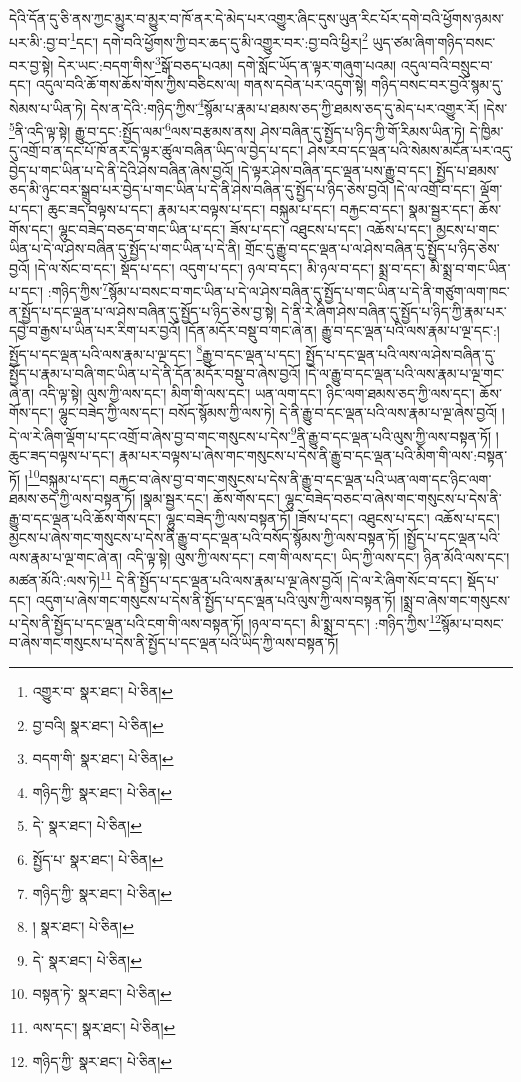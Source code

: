 དེའི་དོན་དུ་ཅི་ནས་ཀྱང་མྱུར་བ་མྱུར་བ་ཁོ་ནར་དེ་མེད་པར་འགྱུར་ཞིང་དུས་ཡུན་རིང་པོར་དགེ་བའི་ཕྱོགས་ཉམས་པར་མི་:བྱ་བ་\footnote{འགྱུར་བ་  སྣར་ཐང་།  པེ་ཅིན། }དང་། དགེ་བའི་ཕྱོགས་ཀྱི་བར་ཆད་དུ་མི་འགྱུར་བར་:བྱ་བའི་ཕྱིར།\footnote{བྱ་བའི།  སྣར་ཐང་།  པེ་ཅིན། } ཡུད་ཙམ་ཞིག་གཉིད་བསང་བར་བྱ་སྟེ། དེར་ཡང་:བདག་གིས་\footnote{བདག་གི་  སྣར་ཐང་།  པེ་ཅིན། }སྒོ་བཅད་པའམ། དགེ་སློང་ཡོད་ན་ལྟར་གཞུག་པའམ། འདུལ་བའི་བསྲུང་བ་དང་། འདུལ་བའི་ཆོ་གས་ཆོས་གོས་ཀྱིས་བཅིངས་ལ། གནས་དབེན་པར་འདུག་སྟེ། གཉིད་བསང་བར་བྱའོ་སྙམ་དུ་སེམས་པ་ཡིན་ཏེ། དེས་ན་དེའི་:གཉིད་ཀྱིས་\footnote{གཉིད་ཀྱི་  སྣར་ཐང་།  པེ་ཅིན། }སྙོམ་པ་རྣམ་པ་ཐམས་ཅད་ཀྱི་ཐམས་ཅད་དུ་མེད་པར་འགྱུར་རོ། །དེས་\footnote{དེ་  སྣར་ཐང་།  པེ་ཅིན། }ནི་འདི་ལྟ་སྟེ། རྒྱུ་བ་དང་:སྤྱོད་ལམ་\footnote{སྤྱོད་པ་  སྣར་ཐང་།  པེ་ཅིན། }ལས་བརྩམས་ནས། ཤེས་བཞིན་དུ་སྤྱོད་པ་ཉིད་ཀྱི་གོ་རིམས་ཡིན་ཏེ། དེ་ཁྱིམ་དུ་འགྲོ་བ་ན་དང་པོ་ཁོ་ནར་དེ་ལྟར་ཚུལ་བཞིན་ཡིད་ལ་བྱེད་པ་དང་། ཤེས་རབ་དང་ལྡན་པའི་སེམས་མངོན་པར་འདུ་བྱེད་པ་གང་ཡིན་པ་དེ་ནི་དེའི་ཤེས་བཞིན་ཞེས་བྱའོ། །དེ་ལྟར་ཤེས་བཞིན་དང་ལྡན་པས་རྒྱུ་བ་དང་། སྤྱོད་པ་ཐམས་ཅད་མི་ཉུང་བར་སྒྲུབ་པར་བྱེད་པ་གང་ཡིན་པ་དེ་ནི་ཤེས་བཞིན་དུ་སྤྱོད་པ་ཉིད་ཅེས་བྱའོ། །དེ་ལ་འགྲོ་བ་དང་། ལྡོག་པ་དང་། ཆུང་ཟད་བལྟས་པ་དང་། རྣམ་པར་བལྟས་པ་དང་། བསྐུམ་པ་དང་། བརྐྱང་བ་དང་། སྣམ་སྦྱར་དང་། ཆོས་གོས་དང་། ལྷུང་བཟེད་བཅད་བ་གང་ཡིན་པ་དང་། ཟོས་པ་དང་། འཐུངས་པ་དང་། འཆོས་པ་དང་། མྱངས་པ་གང་ཡིན་པ་དེ་ལ་ཤེས་བཞིན་དུ་སྤྱོད་པ་གང་ཡིན་པ་དེ་ནི། གྲོང་དུ་རྒྱུ་བ་དང་ལྡན་པ་ལ་ཤེས་བཞིན་དུ་སྤྱོད་པ་ཉིད་ཅེས་བྱའོ། །དེ་ལ་སོང་བ་དང་། སྡོད་པ་དང་། འདུག་པ་དང་། ཉལ་བ་དང་། མི་ཉལ་བ་དང་། སྨྲ་བ་དང་། མི་སྨྲ་བ་གང་ཡིན་པ་དང་། :གཉིད་ཀྱིས་\footnote{གཉིད་ཀྱི་  སྣར་ཐང་།  པེ་ཅིན། }སྙོམ་པ་བསང་བ་གང་ཡིན་པ་དེ་ལ་ཤེས་བཞིན་དུ་སྤྱོད་པ་གང་ཡིན་པ་དེ་ནི་གཙུག་ལག་ཁང་ན་སྤྱོད་པ་དང་ལྡན་པ་ལ་ཤེས་བཞིན་དུ་སྤྱོད་པ་ཉིད་ཅེས་བྱ་སྟེ། དེ་ནི་རེ་ཞིག་ཤེས་བཞིན་དུ་སྤྱོད་པ་ཉིད་ཀྱི་རྣམ་པར་དབྱེ་བ་རྒྱས་པ་ཡིན་པར་རིག་པར་བྱའོ། །དོན་མདོར་བསྡུ་བ་གང་ཞེ་ན། རྒྱུ་བ་དང་ལྡན་པའི་ལས་རྣམ་པ་ལྔ་དང་:།སྤྱོད་པ་དང་ལྡན་པའི་ལས་རྣམ་པ་ལྔ་དང་། \footnote{།   སྣར་ཐང་།  པེ་ཅིན། }རྒྱུ་བ་དང་ལྡན་པ་དང་། སྤྱོད་པ་དང་ལྡན་པའི་ལས་ལ་ཤེས་བཞིན་དུ་སྤྱོད་པ་རྣམ་པ་བཞི་གང་ཡིན་པ་དེ་ནི་དོན་མདོར་བསྡུ་བ་ཞེས་བྱའོ། །དེ་ལ་རྒྱུ་བ་དང་ལྡན་པའི་ལས་རྣམ་པ་ལྔ་གང་ཞེ་ན། འདི་ལྟ་སྟེ། ལུས་ཀྱི་ལས་དང་། མིག་གི་ལས་དང་། ཡན་ལག་དང་། ཉིང་ལག་ཐམས་ཅད་ཀྱི་ལས་དང་། ཆོས་གོས་དང་། ལྷུང་བཟེད་ཀྱི་ལས་དང་། བསོད་སྙོམས་ཀྱི་ལས་ཏེ། དེ་ནི་རྒྱུ་བ་དང་ལྡན་པའི་ལས་རྣམ་པ་ལྔ་ཞེས་བྱའོ། །དེ་ལ་རེ་ཞིག་ལྡོག་པ་དང་འགྲོ་བ་ཞེས་བྱ་བ་གང་གསུངས་པ་དེས་\footnote{དེ་  སྣར་ཐང་།  པེ་ཅིན། }ནི་རྒྱུ་བ་དང་ལྡན་པའི་ལུས་ཀྱི་ལས་བསྟན་ཏོ། །ཆུང་ཟད་བལྟས་པ་དང་། རྣམ་པར་བལྟས་པ་ཞེས་གང་གསུངས་པ་དེས་ནི་རྒྱུ་བ་དང་ལྡན་པའི་མིག་གི་ལས་:བསྟན་ཏོ། །\footnote{བསྟན་ཏེ་  སྣར་ཐང་།  པེ་ཅིན། }བསྐུམ་པ་དང་། བརྐྱང་བ་ཞེས་བྱ་བ་གང་གསུངས་པ་དེས་ནི་རྒྱུ་བ་དང་ལྡན་པའི་ཡན་ལག་དང་ཉིང་ལག་ཐམས་ཅད་ཀྱི་ལས་བསྟན་ཏོ། །སྣམ་སྦྱར་དང་། ཆོས་གོས་དང་། ལྷུང་བཟེད་བཅང་བ་ཞེས་གང་གསུངས་པ་དེས་ནི་རྒྱུ་བ་དང་ལྡན་པའི་ཆོས་གོས་དང་། ལྷུང་བཟེད་ཀྱི་ལས་བསྟན་ཏོ། །ཟོས་པ་དང་། འཐུངས་པ་དང་། འཆོས་པ་དང་། མྱངས་པ་ཞེས་གང་གསུངས་པ་དེས་ནི་རྒྱུ་བ་དང་ལྡན་པའི་བསོད་སྙོམས་ཀྱི་ལས་བསྟན་ཏོ། །སྤྱོད་པ་དང་ལྡན་པའི་ལས་རྣམ་པ་ལྔ་གང་ཞེ་ན། འདི་ལྟ་སྟེ། ལུས་ཀྱི་ལས་དང་། ངག་གི་ལས་དང་། ཡིད་ཀྱི་ལས་དང་། ཉིན་མོའི་ལས་དང་། མཚན་མོའི་:ལས་ཏེ།\footnote{ལས་དང་།  སྣར་ཐང་།  པེ་ཅིན། } དེ་ནི་སྤྱོད་པ་དང་ལྡན་པའི་ལས་རྣམ་པ་ལྔ་ཞེས་བྱའོ། །དེ་ལ་རེ་ཞིག་སོང་བ་དང་། སྡོད་པ་དང་། འདུག་པ་ཞེས་གང་གསུངས་པ་དེས་ནི་སྤྱོད་པ་དང་ལྡན་པའི་ལུས་ཀྱི་ལས་བསྟན་ཏོ། །སྨྲ་བ་ཞེས་གང་གསུངས་པ་དེས་ནི་སྤྱོད་པ་དང་ལྡན་པའི་ངག་གི་ལས་བསྟན་ཏོ། །ཉལ་བ་དང་། མི་སྨྲ་བ་དང་། :གཉིད་ཀྱིས་\footnote{གཉིད་ཀྱི་  སྣར་ཐང་།  པེ་ཅིན། }སྙོམ་པ་བསང་བ་ཞེས་གང་གསུངས་པ་དེས་ནི་སྤྱོད་པ་དང་ལྡན་པའི་ཡིད་ཀྱི་ལས་བསྟན་ཏོ། 